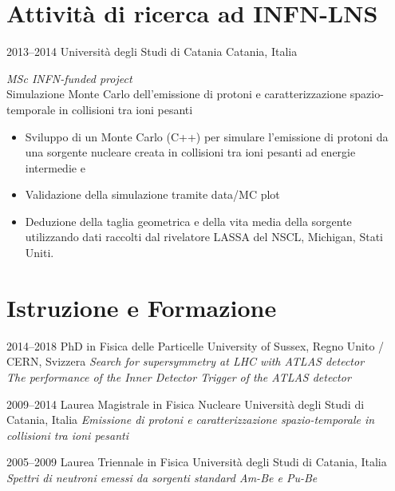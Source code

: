 \documentclass[print]{cv} %
\begin{document}
\section{Attività di ricerca ad INFN-LNS}

\begin{entrylist}
  \entry
      {2013--2014}
      {Università degli Studi di Catania}
      {Catania, Italia}
      {\emph{MSc INFN-funded project}\\
      Simulazione Monte Carlo dell'emissione di protoni e caratterizzazione spazio-temporale in collisioni tra ioni pesanti 
      \begin{itemize}
        \item Sviluppo di un Monte Carlo (C++) per simulare l'emissione di protoni da una sorgente nucleare creata in collisioni tra ioni pesanti ad energie intermedie e 
        \item Validazione della simulazione tramite data/MC plot
        \item Deduzione della taglia geometrica e della vita media della sorgente utilizzando dati raccolti dal rivelatore LASSA del NSCL, Michigan, Stati Uniti. 
      \end{itemize}
      }

\end{entrylist}

\section{Istruzione e Formazione}

\begin{entrylist}

  \entry
      {2014--2018}
      {PhD {\normalfont in Fisica delle Particelle}}
      {University of Sussex, Regno Unito / CERN, Svizzera}
      {\emph{Search for supersymmetry at LHC with ATLAS detector\\
      The performance of the Inner Detector Trigger of the ATLAS detector}
      }

  \entry
      {2009--2014}
      {Laurea Magistrale {\normalfont in Fisica Nucleare}}
      {Università degli Studi di Catania, Italia}
      {\emph{Emissione di protoni e caratterizzazione spazio-temporale in collisioni tra ioni pesanti} }

  \entry
      {2005--2009}
      {Laurea Triennale {\normalfont in Fisica}}
      {Università degli Studi di Catania, Italia}
      {\emph{Spettri di neutroni emessi da sorgenti standard Am-Be e Pu-Be} }
\end{entrylist}
\end{document}
